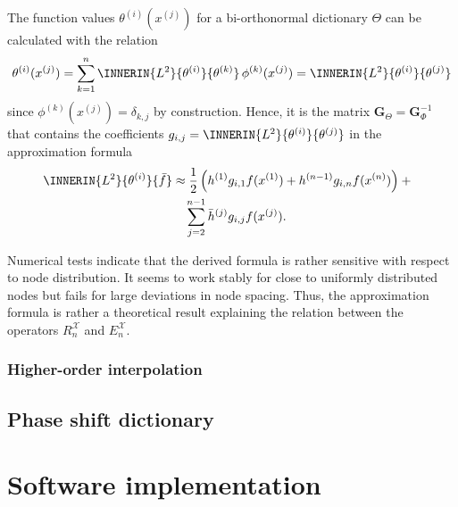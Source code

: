 \documentclass[a4paper]{paper}
\newcommand*{\SPC}[1]{{\ensuremath{\mathscr{#1}}}}
\newcommand*{\EXT}[2]{\ensuremath{E_{#1}^{#2}}}
\newcommand*{\REST}[2]{\ensuremath{R_{#1}^{#2}}}
\newcommand*{\RnX}{{\ensuremath{\REST{n}{\SPC{X}}}}}
\newcommand*{\EnX}{{\ensuremath{\EXT{n}{\SPC{X}}}}}
\newcommand*{\IDX}[2]{{\ensuremath{{#2}^{(#1)}}}}
\newcommand{\vG}{\boldsymbol{G}}
\begin{document}
%
The function values $\IDX{i}{\theta}(\IDX{j}{x})$ for a bi-orthonormal dictionary $\Theta$ can be calculated with the 
relation
%
\begin{equation*}
 \IDX{i}{\theta}(\IDX{j}{x}) 
 = \sum_{k=1}^n \INNERIN{L^2}{\IDX{i}{\theta}}{\IDX{k}{\theta}}\, \IDX{k}{\phi}(\IDX{j}{x})
 = \INNERIN{L^2}{\IDX{i}{\theta}}{\IDX{j}{\theta}}
\end{equation*}
%
since $\IDX{k}{\phi}(\IDX{j}{x}) = \delta_{k,j}$ by construction. Hence, it is the matrix $\vG_\Theta = \vG_\Phi^{-1}$ 
that contains the coefficients $g_{i,j} = \INNERIN{L^2}{\IDX{i}{\theta}}{\IDX{j}{\theta}}$ in the approximation formula
%
\begin{align*}
 \INNERIN{L^2}{\IDX{i}{\theta}}{\bar f}
 & \approx \frac{1}{2}\left(
 \IDX{1}{h} g_{i,1} f(\IDX{1}{x}) + \IDX{n-1}{h} g_{i,n} f(\IDX{n}{x})  
 \right) + \phantom{x} \\
 &\hspace{10pt} \sum_{j=2}^{n-1} \IDX{j}{\bar h} g_{i,j} f(\IDX{j}{x}).
\end{align*}

\begin{remark}
 Numerical tests indicate that the derived formula is rather sensitive with respect to node distribution. It seems to 
 work stably for close to uniformly distributed nodes but fails for large deviations in node spacing. Thus, the 
 approximation formula is rather a theoretical result explaining the relation between the operators $\RnX$ and $\EnX$.
\end{remark}


\subsubsection{Higher-order interpolation}
\label{subsubsec:specif:interp:higher}



\subsection{Phase shift dictionary}
\label{subsec:specif:phase}



\section{Software implementation}
\label{sec:soft}
\end{document}
